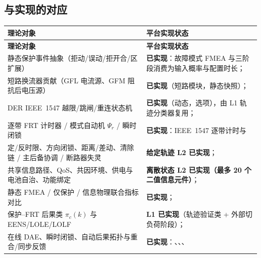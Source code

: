 \subsection{与实现的对应}\label{sec:rel-pf-impl}
\begin{center}\footnotesize
\begin{longtable}{@{}L{5.4cm}L{9.0cm}@{}}
\toprule
\textbf{理论对象} & \textbf{平台实现状态}\\
\midrule
\endfirsthead
\toprule
\textbf{理论对象} & \textbf{平台实现状态}\\
\midrule
\endhead
\bottomrule
\endfoot
静态保护事件抽象（拒动/误动/拒开合/区扩展）& \textbf{已实现}：故障模式 FMEA 与三阶段消费为输入概率与配置时长；\\
短路换流器贡献（GFL 电流源、GFM 阻抗后电压源）& \textbf{已实现}（短路模块，静态快照）；\\
DER IEEE~1547 越限/跳闸/重连状态机 & \textbf{已实现}（动态，选项），由 L1 轨迹分类器复用；\\
逐带 FRT 计时器 / 模式自动机 $\Psi_r$ / 瞬时闭锁 & \textbf{已实现}：IEEE~1547 逐带计时与 \\
定/反时限、方向闭锁、距离/差动、清除链 / 主后备协调 / 断路器失灵 & \textbf{给定轨迹 L2 已实现}；\\
共享信息路径、QoS、共因环境、供电与电池自治、功能绑定 & \textbf{离散状态 L2 已实现（最多 20 个二值信息元件）}；\\
静态 FMEA / 仅保护 / 信息物理联合指标对比 & \textbf{已实现}；\\
保护--FRT 后果类 $\pi_c(k)$ 与 EENS/LOLE/LOLF & \textbf{L1 已实现}（轨迹验证类 + 外部切负荷阶段）；\\
在线 DAE、瞬时闭锁、自动后果拓扑与重合/同步反馈 & \textbf{已实现}：、、、\\
\end{longtable}
\end{center}

